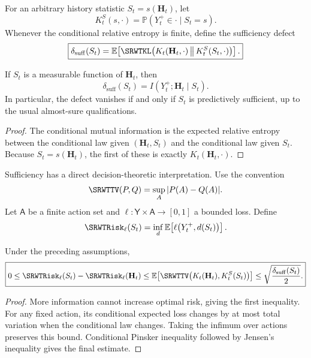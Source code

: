 For an arbitrary history statistic \(S_t=s(\mathbf H_t)\), let
\[
K_t^{S}(s,\cdot)
=
\mathbb P(Y_t^+\in\cdot\mid S_t=s).
\]
Whenever the conditional relative entropy is finite, define the sufficiency
defect
\[
\boxed{
\delta_{\mathrm{suff}}(S_t)
=
\mathbb E\!\left[
\SRWTKL\!\left(
K_t(\mathbf H_t,\cdot)
\,\middle\|\,
K_t^S(S_t,\cdot)
\right)
\right].
}
\]

\begin{SRWTproposition}\label{SRWT:prop:conditional-information}
If \(S_t\) is a measurable function of \(\mathbf H_t\), then
\[
\boxed{
\delta_{\mathrm{suff}}(S_t)
=
I(Y_t^+;\mathbf H_t\mid S_t).
}
\]
In particular, the defect vanishes if and only if \(S_t\) is predictively
sufficient, up to the usual almost-sure qualifications.
\end{SRWTproposition}

\begin{proof}
The conditional mutual information is the expected relative entropy between
the conditional law given \((\mathbf H_t,S_t)\) and the conditional law given
\(S_t\). Because \(S_t=s(\mathbf H_t)\), the first of these is exactly
\(K_t(\mathbf H_t,\cdot)\).
\end{proof}

Sufficiency has a direct decision-theoretic interpretation. Use the
convention
\[
\SRWTTV(P,Q)=\sup_{A}|P(A)-Q(A)|.
\]
Let \(\mathsf A\) be a finite action set and
\(\ell:\mathsf Y\times\mathsf A\to[0,1]\) a bounded loss. Define
\[
\SRWTRisk_\ell(S_t)
=
\inf_{d}
\mathbb E\!\left[
\ell\bigl(Y_t^+,d(S_t)\bigr)
\right].
\]

\begin{SRWTproposition}
\label{SRWT:prop:risk-pinsker}
Under the preceding assumptions,
\[
\boxed{
0
\leq
\SRWTRisk_\ell(S_t)-\SRWTRisk_\ell(\mathbf H_t)
\leq
\mathbb E\!\left[
\SRWTTV\!\left(K_t(\mathbf H_t),K_t^S(S_t)\right)
\right]
\leq
\sqrt{\frac{\delta_{\mathrm{suff}}(S_t)}{2}}.
}
\]
\end{SRWTproposition}

\begin{proof}
More information cannot increase optimal risk, giving the first inequality.
For any fixed action, its conditional expected loss changes by at most total
variation when the conditional law changes. Taking the infimum over actions
preserves this bound. Conditional Pinsker inequality followed by Jensen's
inequality gives the final estimate.
\end{proof}

